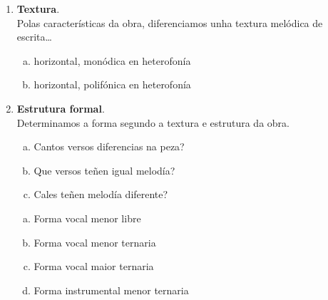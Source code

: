\begin{multicols}{2}
\begin{enumerate}[1.-]
        \item %
        \textbf{Textura}. \\
        Polas características da obra, diferenciamos unha textura melódica de escrita\ldots 
            \begin{enumerate}[a)]
                \item 
                horizontal, monódica en heterofonía
                \item 
                horizontal, polifónica en heterofonía
            \end{enumerate}
        \item %
        \textbf{Estrutura formal}. \\
        Determinamos a forma segundo a textura e estrutura da obra.
            \begin{enumerate}[a)]
                \item
                Cantos versos diferencias na peza? \dotfill
                \item
                Que versos teñen igual melodía? \dotfill
                \item
                Cales teñen melodía diferente? \dotfill
                \end{enumerate}
%
        \begin{enumerate}[a)]
            \item 
            Forma vocal menor libre
            \item
            Forma vocal menor ternaria
            \item
            Forma vocal maior ternaria
            \item
            Forma instrumental menor ternaria
        \end{enumerate}
        \end{enumerate}
%
\end{multicols}
%
